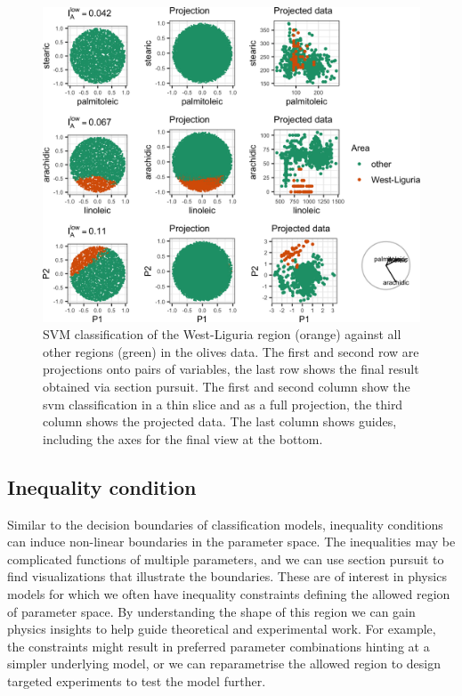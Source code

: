 \documentclass[]{interact}
\theoremstyle{plain}%
\theoremstyle{definition}
\theoremstyle{remark}
\begin{document}
\begin{figure}
\includegraphics[width=1\linewidth]{section_pursuit_files/figure-latex/olives-1} \caption{SVM classification of the West-Liguria region (orange) against all other regions (green) in the olives data. The first and second row are projections onto pairs of variables, the last row shows the final result obtained via section pursuit. The first and second column show the svm classification in a thin slice and as a full projection, the third column shows the projected data. The last column shows guides, including the axes for the final view at the bottom.}\label{fig:olives}
\end{figure}

\hypertarget{inequality-condition}{%
\subsection{Inequality condition}\label{inequality-condition}}

Similar to the decision boundaries of classification models, inequality
conditions can induce non-linear boundaries in the parameter space. The
inequalities may be complicated functions of multiple parameters, and we
can use section pursuit to find visualizations that illustrate the
boundaries. These are of interest in physics models for which we often
have inequality constraints defining the allowed region of parameter
space. By understanding the shape of this region we can gain physics
insights to help guide theoretical and experimental work. For example,
the constraints might result in preferred parameter combinations hinting
at a simpler underlying model, or we can reparametrise the allowed
region to design targeted experiments to test the model further.
\end{document}
